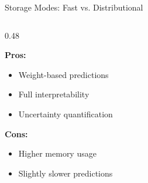 \documentclass[aspectratio=169]{beamer}
\begin{document}
\begin{frame}{Storage Modes: Fast vs. Distributional}
\begin{columns}[T]
\begin{column}{0.48\textwidth}
\vspace{0.2cm}

\textbf{Pros:}
\begin{itemize}
\item Weight-based predictions
\item Full interpretability
\item Uncertainty quantification
\end{itemize}

\vspace{0.2cm}

\textbf{Cons:}
\begin{itemize}
\item Higher memory usage
\item Slightly slower predictions
\end{itemize}

\end{column}

\end{columns}

\end{frame}
\end{document}

